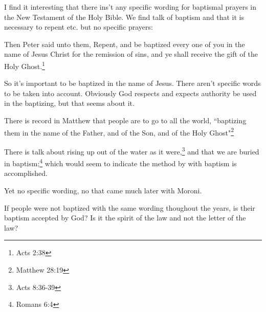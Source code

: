 \documentclass{article}
\begin{document}
I find it interesting that there ins't any specific wording for baptismal
prayers in the New Testament of the Holy Bible. We find talk of baptism and
that it is necessary to repent etc. but no specific prayers:

\begin{displayquote}
Then Peter said unto them, Repent, and be baptized every one of you in the 
name of Jesus Christ for the remission of sins, and ye shall 
receive the gift of the Holy Ghost.\footnote{Acts 2:38}
\end{displayquote}

So it's important to be baptized in the name of Jesus. There aren't specific
words to be taken into account. Obviously God respects and expects authority
be used in the baptizing, but that seems about it.

There is record in Matthew that people are to go to all the world,
``baptizing them in
the name of the Father, 
and of the Son, and of the Holy Ghost"\footnote{Matthew 28:19}

There is talk about rising up out of the water as it 
were,\footnote{Acts 8:36-39} and that we are buried in 
baptism;\footnote{Romans 6:4} which would seem to indicate the method
by with baptism is accomplished.

Yet no specific wording, no that came much later with Moroni.

If people were not baptized with the same wording thoughout the years, is their
baptism accepted by God? Is it the spirit of the law and not the letter of the
law?

\newpage

\printbibliography
\thispagestyle{empty}
\end{document}
